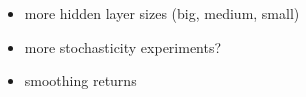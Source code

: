 \documentclass{article}
\begin{document}
\begin{itemize}
    
    
    \item more hidden layer sizes (big, medium, small)
    \item more stochasticity experiments?
    \item smoothing returns
\end{itemize}



\end{document}
